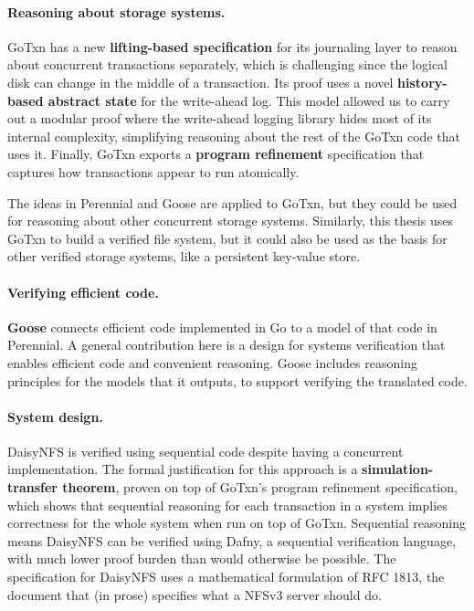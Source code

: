 \paragraph{Reasoning about storage systems.}
GoTxn has a new \textbf{lifting-based specification} for its journaling
layer to reason about concurrent transactions separately, which is
challenging since the logical disk can change in the middle of a transaction. Its proof uses a novel
\textbf{history-based abstract state} for the write-ahead log. This model allowed us to carry
out a modular proof where the write-ahead logging library hides most of
its internal complexity, simplifying reasoning about the rest of the GoTxn
code that uses it. Finally, GoTxn exports a \textbf{program refinement}
specification that captures how transactions appear to run atomically.

The ideas in Perennial and Goose are applied to GoTxn, but they could be used
for reasoning about other concurrent storage systems. Similarly,
this thesis uses GoTxn to build a verified file system, but it could also be used
as the basis for other verified storage systems, like a persistent key-value
store.

\paragraph{Verifying efficient code.}
\textbf{Goose} connects efficient code implemented in Go to a model of that code
in Perennial. A general contribution here is a design for systems verification
that enables efficient code and convenient reasoning. Goose includes reasoning
principles for the models that it outputs, to support verifying the translated
code.

\paragraph{System design.}
DaisyNFS is verified using sequential code despite having a concurrent
implementation. The formal justification for this approach is a
\textbf{simulation-transfer theorem}, proven on top of GoTxn's program
refinement specification, which shows that sequential reasoning for each
transaction in a system implies correctness for the whole system when run on top
of GoTxn. Sequential reasoning means DaisyNFS can be verified using Dafny, a
sequential verification language, with much lower proof burden than would
otherwise be possible. The specification for DaisyNFS uses a mathematical
formulation of RFC 1813, the document that (in prose) specifies what a NFSv3
server should do.


